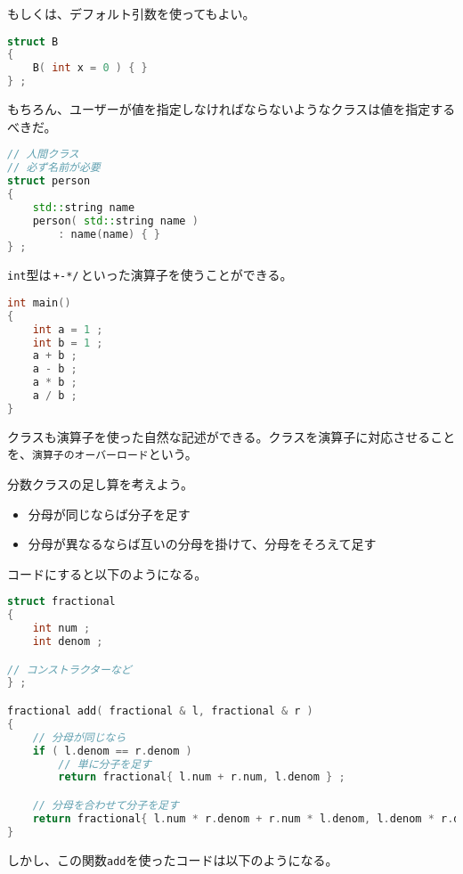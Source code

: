 もしくは、デフォルト引数を使ってもよい。

\begin{lstlisting}[language={C++}]
struct B
{
    B( int x = 0 ) { }
} ;
\end{lstlisting}

もちろん、ユーザーが値を指定しなければならないようなクラスは値を指定するべきだ。

\begin{lstlisting}[language={C++}]
// 人間クラス
// 必ず名前が必要
struct person
{
    std::string name
    person( std::string name )
        : name(name) { }
} ;
\end{lstlisting}


\texttt{int}型は\,\texttt{+-*/}\,といった演算子を使うことができる。

\begin{lstlisting}[language={C++}]
int main()
{
    int a = 1 ;
    int b = 1 ;
    a + b ;
    a - b ;
    a * b ;
    a / b ;
}
\end{lstlisting}

クラスも演算子を使った自然な記述ができる。クラスを演算子に対応させることを、\texttt{演算子のオーバーロード}という。

分数クラスの足し算を考えよう。

\begin{itemize}
\item
  分母が同じならば分子を足す
\item
  分母が異なるならば互いの分母を掛けて、分母をそろえて足す
\end{itemize}

コードにすると以下のようになる。

\ifTombow\pagebreak\fi
\begin{lstlisting}[language={C++}]
struct fractional
{
    int num ;
    int denom ;

// コンストラクターなど
} ;

fractional add( fractional & l, fractional & r )
{
    // 分母が同じなら
    if ( l.denom == r.denom )
        // 単に分子を足す
        return fractional{ l.num + r.num, l.denom } ;

    // 分母を合わせて分子を足す
    return fractional{ l.num * r.denom + r.num * l.denom, l.denom * r.denom } ;
}
\end{lstlisting}

しかし、この関数\texttt{add}を使ったコードは以下のようになる。


